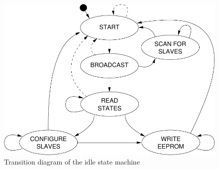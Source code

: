 \documentclass[a4paper,12pt,BCOR6mm,bibtotoc,idxtotoc]{scrbook}
\begin{document}
\begin{figure}[htbp]
  \centering
  \includegraphics[width=.8\textwidth]{images/fsm-idle}
  \caption{Transition diagram of the idle state machine}
  \label{fig:fsm-idle}
\end{figure}
\end{document}
